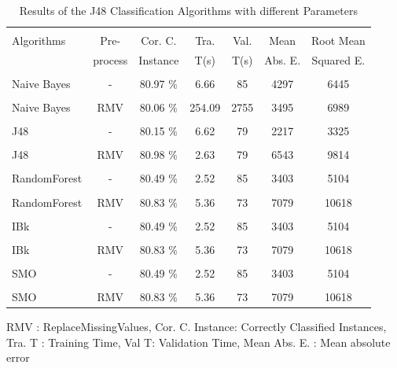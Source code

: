 \documentclass[a4paper]{article}
\begin{document}
\begin{table}
\begin{tabular}{|l| c | c | c | c |c |c |}

\hline & & & & & & \\
Algorithms & Pre- & Cor. C.& Tra. & Val. & Mean & Root Mean \\
 & process  & Instance & T(s) &  T(s) &  Abs. E. & Squared E. \\
\hline & & & & & & \\
Naive Bayes		& - &			80.97  $\%$ & 6.66 & 85 & 4297  & 6445 \\ 
\hline & & & & & & \\
Naive Bayes	 	& RMV &	80.06 $\%$ & 254.09 & 2755 & 3495  & 6989  \\ 
\hline & & & & & & \\
J48	 		& - &			80.15  $\%$ & 6.62 & 79 &  2217 & 3325\\ 
\hline 	& & & & & & \\
J48  			& RMV &			80.98 $\%$ & 2.63 & 79 &  6543 & 9814 \\ 
\hline & & & & & & \\
RandomForest  	 & - &			80.49 $\%$ & 2.52 & 85 &  3403 & 5104 \\ 
\hline & & & & & & \\
RandomForest 	& RMV &			 80.83 $\%$ & 5.36 &  73 & 7079 & 10618\\ 
\hline & & & & & & \\
IBk  			 & - &			80.49 $\%$ & 2.52 & 85 &  3403 & 5104 \\ 
\hline & & & & & & \\
IBk 			& RMV &			 80.83 $\%$ & 5.36 &  73 & 7079 & 10618\\ 
\hline & & & & & & \\
SMO		  	 & - &			80.49 $\%$ & 2.52 & 85 &  3403 & 5104 \\ 
\hline & & & & & & \\
SMO 			& RMV &			 80.83 $\%$ & 5.36 &  73 & 7079 & 10618\\ 
\hline
\end{tabular}
\caption{Results of the J48 Classification Algorithms with different Parameters}
    RMV : ReplaceMissingValues,
	Cor. C. Instance:  Correctly Classified Instances,
	Tra. T : Training Time,
	Val T: Validation Time,
	Mean Abs. E. : Mean absolute error 
\end{table}
\end{document}
